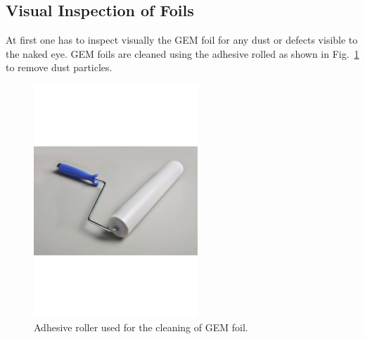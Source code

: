 \subsection{Visual Inspection of Foils} %
\label{sub:visual_inspection}
At first one has to inspect visually the GEM foil for any dust or defects visible to the naked eye.
GEM foils are cleaned using the adhesive rolled as shown in Fig.~\ref{fig:adhesive_roller} to remove dust particles.
\begin{figure}[htbp]
    \centering
    \includegraphics[width=0.55\textwidth]{figures/GEM/Adhesive_roller.pdf}
    \caption{Adhesive roller used for the cleaning of GEM foil.}
    \label{fig:adhesive_roller}
\end{figure}

